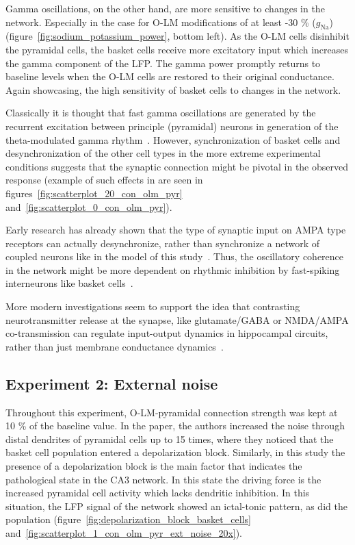 Gamma oscillations, on the other hand, are more sensitive to changes in the network. Especially in the case for O-LM modifications of at least -30 \% (\(g_{\text{Na}}\))
(figure~\ref{fig:sodium_potassium_power}, bottom left). As the O-LM cells disinhibit the pyramidal cells, the basket cells receive more excitatory input which
increases the gamma component of the LFP\@. The gamma power promptly returns to baseline levels when the O-LM cells are restored to their original conductance.
Again showcasing, the high sensitivity of basket cells to changes in the network.

Classically it is thought that fast gamma oscillations are generated by the recurrent excitation between principle (pyramidal) neurons in
generation of the theta-modulated gamma rhythm~\parencite{wangGammaOscillationSynaptic1996}. However, synchronization of basket cells and
desynchronization of the other cell types in the more extreme experimental conditions suggests that the synaptic connection might be pivotal
in the observed response (example of such effects in are seen in figures~\ref{fig:scatterplot_20_con_olm_pyr} and~\ref{fig:scatterplot_0_con_olm_pyr}).

Early research has already shown that the type of synaptic input on AMPA type receptors can actually desynchronize, rather than synchronize
a network of coupled neurons like in the model of this study~\parencite{vanvreeswijkWhenInhibitionNot1994,khazipovSynchronizationGABAergicInterneuronal1997}.
Thus, the oscillatory coherence in the network might be more dependent on rhythmic inhibition by fast-spiking interneurons
like basket cells~\parencite{lyttonSimulationsCorticalPyramidal1991}.

More modern investigations seem to support the idea that contrasting neurotransmitter release at the synapse, like glutamate/GABA or NMDA/AMPA co-transmission
can regulate input-output dynamics in hippocampal circuits, rather than just membrane
conductance dynamics~\parencite{ajibolaHypothalamicGlutamateGABA2021,micheliMechanisticModelNMDA2021}.

\subsection{Experiment 2: External noise}
Throughout this experiment, O-LM-pyramidal connection strength was kept at 10 \% of the baseline value.
In the \textcite{sanjayImpairedDendriticInhibition2015} paper, the authors increased the noise through distal dendrites of pyramidal cells up to 15 times,
where they noticed that the basket cell population entered a depolarization block. Similarly, in this study the presence of a depolarization block is the main factor
that indicates the pathological state in the CA3 network. In this state the driving force is the increased pyramidal cell activity which lacks dendritic inhibition.
In this situation, the LFP signal of the network showed an ictal-tonic pattern, as did the
population (figure~\ref{fig:depolarization_block_basket_cells} and~\ref{fig:scatterplot_1_con_olm_pyr_ext_noise_20x}).

